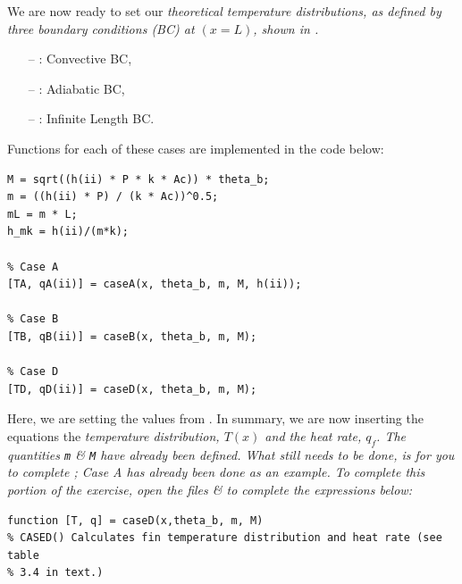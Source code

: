 \documentclass[11pt, letterpaper]{article}
\begin{document}
We are now ready to set our \it{theoretical} temperature distributions, as defined by three boundary conditions (BC) at $(x=L)$, shown in .

\begin{itemize}
    \item [--] : Convective BC,
    \item [--] : Adiabatic BC,
    \item [--] : Infinite Length BC.
\end{itemize} 

Functions for each of these cases are implemented in the code below:
\n
\begin{lstlisting}[numbers=none]
% m & M
M = sqrt((h(ii) * P * k * Ac)) * theta_b;
m = ((h(ii) * P) / (k * Ac))^0.5;
mL = m * L;
h_mk = h(ii)/(m*k);

% Case A
[TA, qA(ii)] = caseA(x, theta_b, m, M, h(ii));

% Case B
[TB, qB(ii)] = caseB(x, theta_b, m, M);

% Case D
[TD, qD(ii)] = caseD(x, theta_b, m, M);
\end{lstlisting}

\n
Here, we are setting the values from . In summary, we are now inserting the equations the \it{temperature distribution}, $T(x)$ and the \it{heat rate}, $q_f$.  The quantities \texttt{m} \& \texttt{M} have already been defined. What still needs to be done, is for you to complete ; Case A has already been done as an example.
\n
To complete this portion of the exercise, open the files  \&  to complete the expressions below:
\n

\begin{lstlisting}[numbers=none]
function [T, q] = caseD(x,theta_b, m, M)
% CASED() Calculates fin temperature distribution and heat rate (see table
% 3.4 in text.)
\end{lstlisting}
\end{document}
